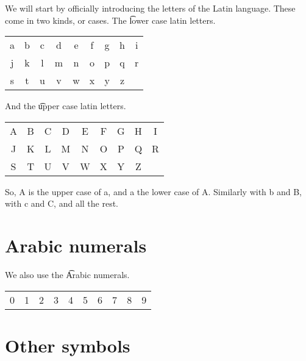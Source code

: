 We will start by officially introducing the letters of the Latin language.
These come in two kinds, or cases.
The \t{lower case latin letters}.
\begin{center}\begin{tabular}{ccccccccc}

   a & b & c & d & e & f & g & h & i \\

   j & k & l & m & n & o & p & q & r \\

   s & t & u & v & w & x & y & z & \\

   \end{tabular}\end{center}
And the \t{upper case latin letters}.
\begin{center}\begin{tabular}{ccccccccc}

   A & B & C & D & E & F & G & H & I \\

   J & K & L & M & N & O & P & Q & R \\

   S & T & U & V & W & X & Y & Z & \\

\end{tabular}\end{center}
So, A is the upper case of a, and a the lower case of A.
Similarly with b and B, with c and C, and all the rest.

\section*{Arabic numerals}

We also use the \t{Arabic numerals}.
\begin{center}
\vspace{0.3cm}
\begin{tabular}{cccccccccc}
0 & 1 & 2 & 3 & 4 & 5 & 6 & 7 & 8 & 9\\
\end{tabular}
\vspace{0.1cm}

\end{center}

\section*{Other symbols}


